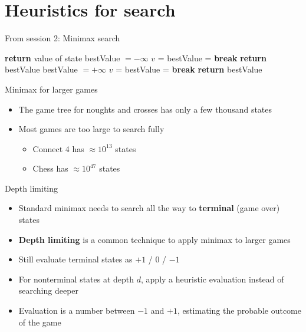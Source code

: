 \part{Heuristics for search}
\frame{\partpage}

\begin{frame}{From session 2: Minimax search}
	\footnotesize
	\begin{algorithmic}
				\State \textbf{return} value of state 
				\State bestValue $= -\infty$ 
					\State $v$ =  
					\State bestValue =  
						\State \textbf{break}
					\EndIf
				\EndFor
				\State \textbf{return} bestValue 
				\State bestValue $= +\infty$
					\State $v$ = 
					\State bestValue = 
						\State \textbf{break}
					\EndIf
				\EndFor
				\State \textbf{return} bestValue 
			\EndIf
		\EndProcedure
	\end{algorithmic}
\end{frame}

\begin{frame}{Minimax for larger games}
	\begin{itemize}
		\pause\item The game tree for noughts and crosses has only a few thousand states
		\pause\item Most games are too large to search fully
			\begin{itemize}
				\pause\item Connect 4 has $\approx 10^{13}$ states
				\pause\item Chess has $\approx 10^{47}$ states
			\end{itemize}
	\end{itemize}
\end{frame}

\begin{frame}{Depth limiting}
	\begin{itemize}
		\pause\item Standard minimax needs to search all the way to \textbf{terminal} (game over) states
		\pause\item \textbf{Depth limiting} is a common technique to apply minimax to larger games
		\pause\item Still evaluate terminal states as $+1$ / $0$ / $-1$
		\pause\item For nonterminal states at depth $d$, apply a heuristic evaluation instead of searching deeper
		\pause\item Evaluation is a number between $-1$ and $+1$, estimating the probable outcome of the game
	\end{itemize}
\end{frame}

